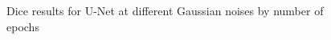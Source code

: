 \begin{figure}
    \centerline{}
    \caption{Dice results for U-Net at different Gaussian noises by number of epochs}
    \label{figure:all-noises-by-epoch-dice-unet}
\end{figure}


